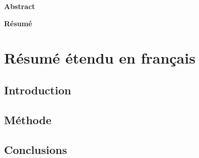 
\openchapter
\checktoopen
{}
\begin{center}
\textbf{Abstract}
\end{center}



\openchapter
\checktoopen
{}
\begin{center}
\textbf{Résumé}
\end{center}



\openchapter
\checktoopen
\setcounter{chapter}{1}
\chapter{Résumé étendu en français}
\section{Introduction}
\section{Méthode}
\section{Conclusions}
